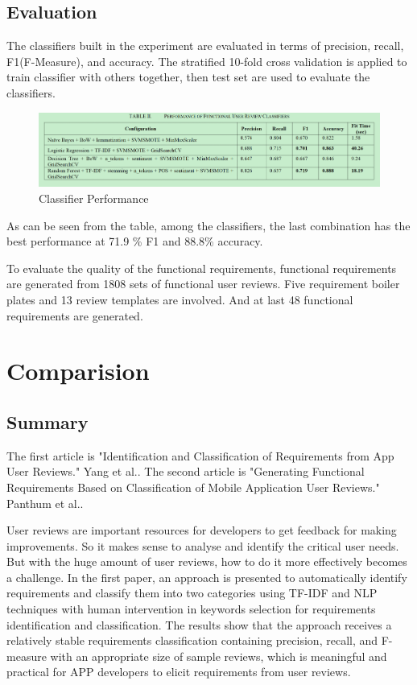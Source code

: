 \section{Evaluation}
The classifiers built in the experiment are evaluated in
terms of precision, recall, F1(F-Measure), and accuracy. The stratified 10-fold cross validation is applied to train classifier with others together, then test set are used to evaluate the classifiers.

\begin{figure}[H] 
\centering
\includegraphics[scale=0.5]{../images/Thema1_ClassifierPerformance.png}
\caption{Classifier Performance}
\label{fig:model}
\end{figure}
As can be seen from the table, among the classifiers,
the last combination has the best performance at 71.9 \% F1 and 88.8\% accuracy.

To evaluate the quality of the functional requirements, functional requirements are generated from 1808 sets of functional user reviews. Five requirement boiler plates and 13 review templates are involved. And at last 48 functional requirements are generated.

\chapter{Comparision}
\section{Summary}

The first article is "Identification and Classification of Requirements from App User Reviews." Yang et al.\cite{YangLiang2015}.
The second article is "Generating Functional Requirements Based on Classification of Mobile Application User Reviews." Panthum et al.\cite{PanthumSenivongse2021}.

User reviews are important resources for developers to get feedback for making improvements. So it makes sense to analyse and identify the critical user needs. But with the huge amount of user reviews, how to do it more effectively becomes a challenge. In the first paper, an approach is presented to automatically identify requirements and classify them into two categories using TF-IDF and NLP techniques with human intervention in keywords selection for requirements identification and classification. The results show that the approach receives a relatively stable requirements classification containing precision, recall, and F-measure with an appropriate size of sample reviews, which is meaningful and practical for APP developers to elicit requirements from user reviews.

